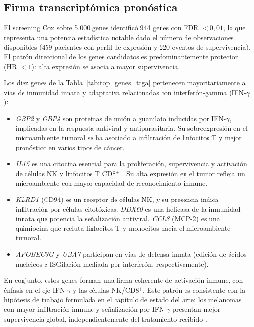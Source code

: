 \subsection{Firma transcriptómica pronóstica}

El screening Cox sobre 5.000 genes identificó 944 genes con FDR $< 0{,}01$, lo que representa una potencia estadística notable dado el número de observaciones disponibles (459 pacientes con perfil de expresión y 220 eventos de supervivencia). El patrón direccional de los genes candidatos es predominantemente protector (HR $< 1$): alta expresión se asocia a mayor supervivencia.

Los diez genes de la Tabla~\ref{tab:top_genes_tcga} pertenecen mayoritariamente a vías de inmunidad innata y adaptativa relacionadas con interferón-gamma (IFN-$\gamma$):

\begin{itemize}
  \item \textit{GBP2} y \textit{GBP4} son proteínas de unión a guanilato inducidas por IFN-$\gamma$, implicadas en la respuesta antiviral y antiparasitaria. Su sobreexpresión en el microambiente tumoral se ha asociado a infiltración de linfocitos T y mejor pronóstico en varios tipos de cáncer.
  \item \textit{IL15} es una citocina esencial para la proliferación, supervivencia y activación de células NK y linfocitos T CD8$^+$ \cite{FifeBluestone2008}. Su alta expresión en el tumor refleja un microambiente con mayor capacidad de reconocimiento inmune.
  \item \textit{KLRD1} (CD94) es un receptor de células NK, y su presencia indica infiltración por células citotóxicas. \textit{DDX60} es una helicasa de la inmunidad innata que potencia la señalización antiviral. \textit{CCL8} (MCP-2) es una quimiocina que recluta linfocitos T y monocitos hacia el microambiente tumoral.
  \item \textit{APOBEC3G} y \textit{UBA7} participan en vías de defensa innata (edición de ácidos nucleicos e ISGilación mediada por interferón, respectivamente).
\end{itemize}

En conjunto, estos genes forman una firma coherente de activación inmune, con énfasis en el eje IFN-$\gamma$ y las células NK/CD8$^+$. Este patrón es consistente con la hipótesis de trabajo formulada en el capítulo de estado del arte: los melanomas con mayor infiltración inmune y señalización por IFN-$\gamma$ presentan mejor supervivencia global, independientemente del tratamiento recibido \cite{DasTCGA2020}.

